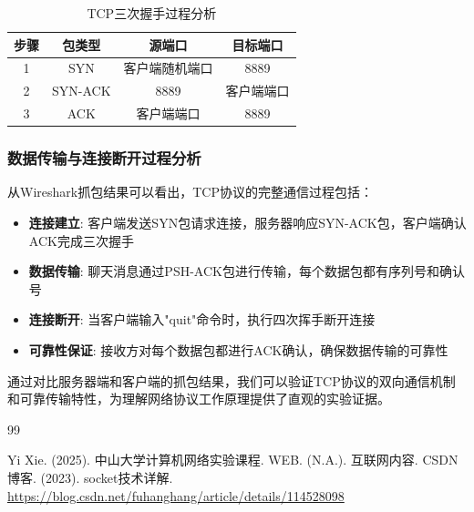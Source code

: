 \documentclass[a4paper]{article}
\begin{document}
\begin{table}[H]
    \centering
    \caption{TCP三次握手过程分析}
    \begin{tabular}{@{}cccc@{}}
        \toprule
        \textbf{步骤} & \textbf{包类型} & \textbf{源端口} & \textbf{目标端口} \\
        \midrule
        1 & SYN & 客户端随机端口 & 8889 \\
        2 & SYN-ACK & 8889 & 客户端端口 \\
        3 & ACK & 客户端端口 & 8889 \\
        \bottomrule
    \end{tabular}
\end{table}

\subsubsection{数据传输与连接断开过程分析}

从Wireshark抓包结果可以看出，TCP协议的完整通信过程包括：

\begin{itemize}
    \item \textbf{连接建立}: 客户端发送SYN包请求连接，服务器响应SYN-ACK包，客户端确认ACK完成三次握手
    \item \textbf{数据传输}: 聊天消息通过PSH-ACK包进行传输，每个数据包都有序列号和确认号
    \item \textbf{连接断开}: 当客户端输入"quit"命令时，执行四次挥手断开连接
    \item \textbf{可靠性保证}: 接收方对每个数据包都进行ACK确认，确保数据传输的可靠性
\end{itemize}

通过对比服务器端和客户端的抓包结果，我们可以验证TCP协议的双向通信机制和可靠传输特性，为理解网络协议工作原理提供了直观的实验证据。

\begin{thebibliography}{99}  

    Yi Xie. (2025). 中山大学计算机网络实验课程.
    WEB. (N.A.). 互联网内容.
    CSDN博客. (2023). socket技术详解. \url{https://blog.csdn.net/fuhanghang/article/details/114528098}

\end{thebibliography}
\end{document}
